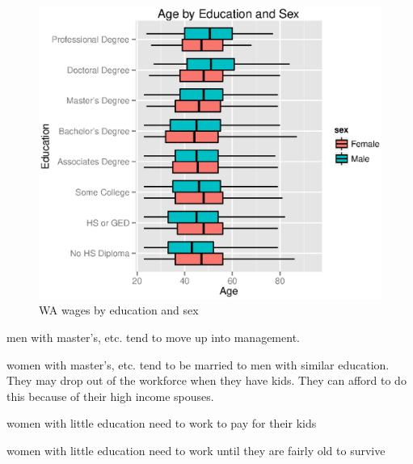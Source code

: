 \documentclass{exam}
\begin{document}
  \begin{figure}[H]
    \centering
    \includegraphics{figures/wa_age_by_education_and_sex.eps}
    \caption{WA wages by education and sex}
  \end{figure}

  \begin{itemize*}
    \item men with master's, etc. tend to move up into management. 

    \item women with master's, etc. tend to be married to men with similar education.  They may
      drop out of the workforce when they have kids.  They can afford to do this because of their
      high income spouses.

    \item women with little education need to work to pay for their kids

    \item women with little education need to work until they are fairly old to survive

  \end{itemize*}
\end{document}
